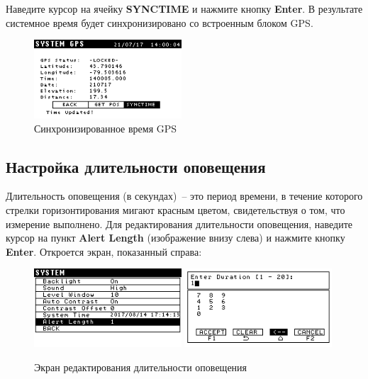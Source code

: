 Наведите курсор на ячейку \textbf{SYNCTIME} и нажмите кнопку \textbf{Enter}. В
результате системное время будет синхронизировано со встроенным блоком GPS.

\begin{figure}[H]
  \centering
  \includegraphics[width=0.49\textwidth]{figures/gps_time_synced}
  \caption{Синхронизированное время GPS}
  \label{fig:gps_time_synced}
\end{figure}

\subsection{Настройка длительности оповещения}

Длительность оповещения (в секундах)~-- это период времени, в течение которого
стрелки горизонтирования мигают красным цветом, свидетельствуя о том, что измерение
выполнено. Для редактирования длительности оповещения, наведите курсор на пункт
\textbf{Alert Length} (изображение внизу слева) и нажмите кнопку \textbf{Enter}.
Откроется экран, показанный справа:

\begin{figure}[H]
  \centering
  \includegraphics[width=0.49\textwidth]{figures/the_alert_length_editing_screen_1}
  \includegraphics[width=0.49\textwidth]{figures/the_alert_length_editing_screen_2}
  \caption{Экран редактирования длительности оповещения}
  \label{fig:the_alert_length_editing_screen}
\end{figure}

